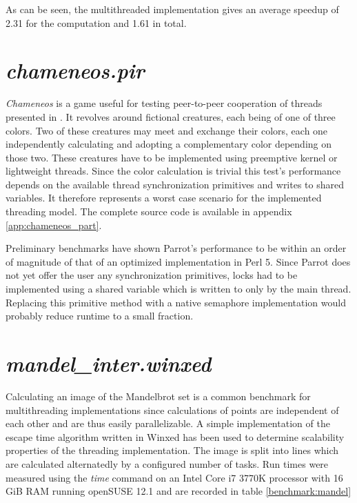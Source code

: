\documentclass[bachelor,english]{hgbthesis}
\begin{document}
As can be seen, the multithreaded implementation gives an average speed\-up of 2.31 for the computation and 1.61 in total.

\section{\textit{chameneos.pir}}

\textit{Chameneos} is a game useful for testing peer-to-peer cooperation of threads presented in \cite{Chameneos}. It revolves around fictional creatures, each being of one of three colors. Two of these creatures may meet and exchange their colors, each one independently calculating and adopting a complementary color depending on those two. These creatures have to be implemented using preemptive kernel or lightweight threads. Since the color calculation is trivial this test's performance depends on the available thread synchronization primitives and writes to shared variables. It therefore represents a worst case scenario for the implemented threading model. The complete source code is available in appendix \ref{app:chameneos_part}.

Preliminary benchmarks have shown Parrot's performance to be within an order of magnitude of that of an optimized implementation in Perl 5. Since Parrot does not yet offer the user any synchronization primitives, locks had to be implemented using a shared variable which is written to only by the main thread. Replacing this primitive method with a native semaphore implementation would probably reduce runtime to a small fraction.

\section{\textit{mandel\_inter.winxed}}

Calculating an image of the Mandelbrot set \cite{Mandelbrot} is a common benchmark for multithreading implementations since calculations of points are independent of each other and are thus easily parallelizable. A simple implementation of the escape time algorithm written in Winxed has been used to determine scalability properties of the threading implementation. The image is split into lines which are calculated alternatedly by a configured number of tasks. Run times were measured using the \textit{time} command on an Intel Core i7 3770K processor with 16 GiB RAM running openSUSE 12.1 and are recorded in table \ref{benchmark:mandel}
\end{document}
